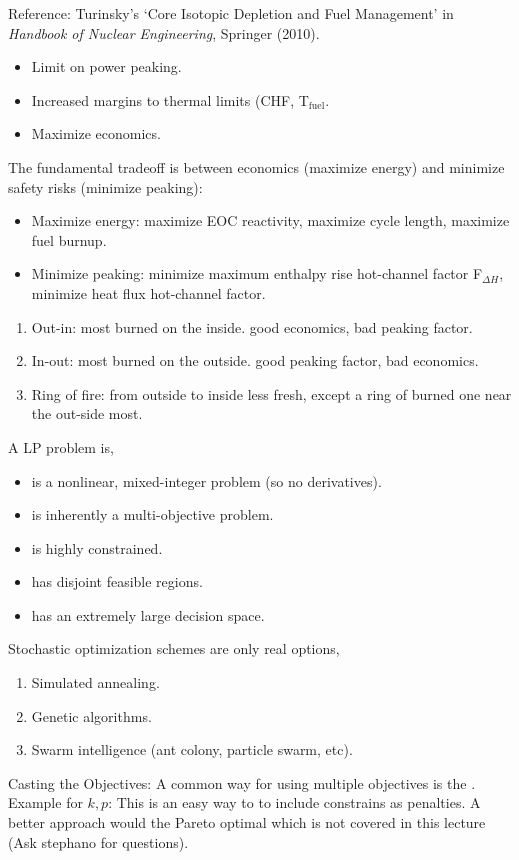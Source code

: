\documentclass{school-22.211-notes}
\date{May 14, 2012}
\begin{document}
\maketitle

Reference: Turinsky's `Core Isotopic Depletion and Fuel Management' in \textit{Handbook of Nuclear Engineering}, Springer (2010). 
\begin{itemize}
\item Limit on power peaking. 
\item Increased margins to thermal limits (CHF, T$_{\mathrm{fuel}}$. 
\item Maximize economics. 
\end{itemize}
The fundamental tradeoff is between economics (maximize energy) and minimize safety risks (minimize peaking):
\begin{itemize}
\item Maximize energy: maximize EOC reactivity, maximize cycle length, maximize fuel burnup. 
\item Minimize peaking: minimize maximum enthalpy rise hot-channel factor F$_{\Delta H}$, minimize heat flux hot-channel factor. 
\end{itemize}


\begin{enumerate}
\item Out-in: most burned on the inside. good economics, bad peaking factor. 
\item In-out: most burned on the outside. good peaking factor, bad economics.
\item Ring of fire: from outside to inside less fresh, except a ring of burned one near the out-side most. 
\end{enumerate}
A LP problem is, 
\begin{itemize}
\item is a nonlinear, mixed-integer problem (so no derivatives).
\item is inherently a multi-objective problem. 
\item is highly constrained. 
\item has disjoint feasible regions.
\item has an extremely large decision space. 
\end{itemize}
Stochastic optimization schemes are only real options, 
\begin{enumerate}
\item Simulated annealing.
\item Genetic algorithms.
\item Swarm intelligence (ant colony, particle swarm, etc). 
\end{enumerate}
Casting the Objectives: A common way for using multiple objectives is the . Example for $k, p$: 
This is an easy way to to include constrains as penalties. A better approach would the Pareto optimal which is not covered in this lecture (Ask stephano for questions). 
\end{document}

